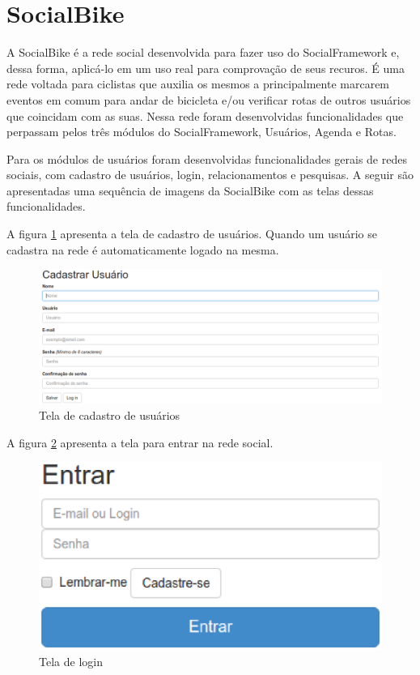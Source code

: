 \section{SocialBike}
\label{sec:SocialBike}

A SocialBike é a rede social desenvolvida para fazer uso do SocialFramework e, dessa forma, aplicá-lo em um uso real para comprovação de seus recuros. É uma rede voltada para ciclistas que auxilia os mesmos a principalmente marcarem eventos em comum para andar de bicicleta e/ou verificar rotas de outros usuários que coincidam com as suas. Nessa rede foram desenvolvidas funcionalidades que perpassam pelos três módulos do SocialFramework, Usuários, Agenda e Rotas.

Para os módulos de usuários foram desenvolvidas funcionalidades gerais de redes sociais, com cadastro de usuários, login, relacionamentos e pesquisas. A seguir são apresentadas uma sequência de imagens da SocialBike com as telas dessas funcionalidades.

A figura \ref{cadastrar_usuario} apresenta a tela de cadastro de usuários. Quando um usuário se cadastra na rede é automaticamente logado na mesma.

\newpage
\begin{figure}[!h]
	\centering
	\includegraphics[scale=0.4]{figuras/resultados/cadastrar_usuario.eps}
	\caption[Tela de cadastro de usuários]{Tela de cadastro de usuários}
	\label{cadastrar_usuario}
\end{figure}

A figura \ref{login} apresenta a tela para entrar na rede social.

\begin{figure}[!h]
	\centering
	\includegraphics[scale=0.5]{figuras/resultados/login.eps}
	\caption[Tela de login]{Tela de login}
	\label{login}
\end{figure}

